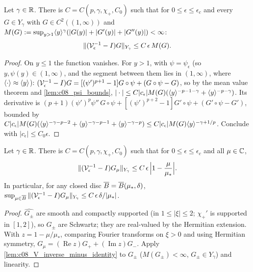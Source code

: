 \begin{lemma}
  \label{lem:c08_V_inverse_minus_identity}
  Let $\gamma\in\mathbb{R}$. There is $C=C(p,\gamma,\chi_+,C_0)$ such that for $0\le\epsilon\le\epsilon_c$ and every
  $G\in Y_\gamma$ with $G\in C^2((1,\infty))$ and
  $M(G):=\sup_{y>1}\langle y \rangle^\gamma(|G(y)|+|G'(y)|+|G''(y)|)<\infty$:
  \[
    \|(\mathcal{V}_\epsilon^{-1}-I)G\|_{Y_\gamma}\le C\,\epsilon\,M(G).
  \]
\end{lemma}
\begin{proof}
  On $y\le1$ the function vanishes. For $y>1$, with $\psi=\psi_\epsilon$ (so $y,\psi(y)\in(1,\infty)$, and the segment
  between them lies in $(1,\infty)$, where $\langle \cdot \rangle\approx\langle y \rangle$):
  $(\mathcal{V}_\epsilon^{-1}-I)G=[(\psi')^{p+1}-1]G\circ\psi+(G\circ\psi-G)$, so by the mean value theorem and
  \cref{lem:c08_psi_bounds}, $|\cdot|\le C|c_\epsilon|M(G)(\langle y \rangle^{-p-1-\gamma}+\langle y \rangle^{-p-\gamma})$. Its derivative is
  $(p+1)(\psi')^p\psi''\,G\circ\psi+[(\psi')^{p+2}-1]G'\circ\psi+(G'\circ\psi-G')$, bounded by
  $C|c_\epsilon|M(G)(\langle y \rangle^{-\gamma-p-2}+\langle y \rangle^{-\gamma-p-1}+\langle y \rangle^{-\gamma-p})\le C|c_\epsilon|M(G)\langle y \rangle^{-\gamma+1/p}$.
  Conclude with $|c_\epsilon|\le C_0\epsilon$.
\end{proof}

\begin{lemma}[Transport of $G_\mu$]
  \label{lem:c08_V_inverse_G_mu}
  Let $\gamma\in\mathbb{R}$. There is $C=C(p,\gamma,\chi_+,C_0)$ such that for $0\le\epsilon\le\epsilon_c$ and all $\mu\in\mathbb{C}$,
  \[
    \|(\mathcal{V}_\epsilon^{-1}-I)G_\mu\|_{Y_\gamma}\le C\,\epsilon\,\Bigl|1-\frac{\mu}{\mu_*}\Bigr| .
  \]
  In particular, for any closed disc $\overline{B}=\overline{B}(\mu_*,\delta)$,
  $\sup_{\mu\in\overline{B}}\|(\mathcal{V}_\epsilon^{-1}-I)G_\mu\|_{Y_\gamma}\le C\,\epsilon\,\delta/|\mu_*|$.
\end{lemma}
\begin{proof}
  $\widehat{G_\pm}$ are smooth and compactly supported (in $1\le|\xi|\le2$; $\chi_+'$ is supported in $[1,2]$), so
  $G_\pm$ are Schwartz; they are real-valued by the Hermitian extension. With $z=1-\mu/\mu_*$, comparing
  Fourier transforms on $\xi>0$ and using Hermitian symmetry, $G_\mu=(\operatorname{Re}z)G_++(\operatorname{Im}z)G_-$.
  Apply \cref{lem:c08_V_inverse_minus_identity} to $G_\pm$ ($M(G_\pm)<\infty$, $G_\pm\in Y_\gamma$) and linearity.
\end{proof}

